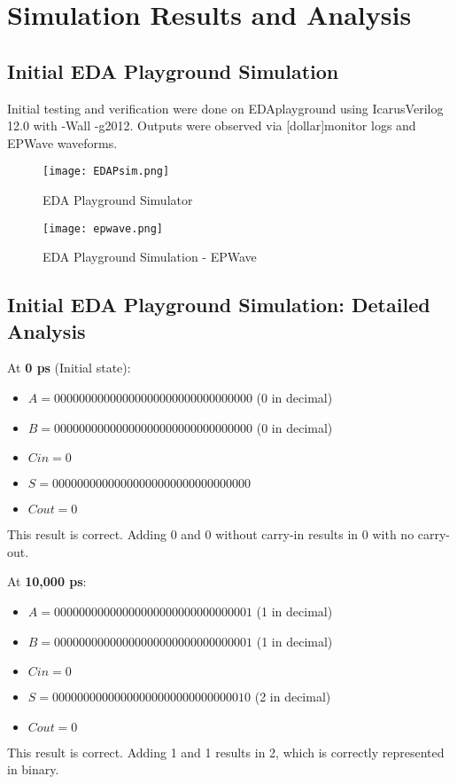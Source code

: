 \documentclass{IEEEtran}
\begin{document}
\section{Simulation Results and Analysis}
\subsection{Initial EDA Playground Simulation}
Initial testing and verification were done on EDAplayground using IcarusVerilog 12.0 with -Wall -g2012. Outputs were observed via [dollar]monitor logs and EPWave waveforms.
\begin{figure}[H]
    \centering
    \texttt{[image: EDAPsim.png]}
    \caption{EDA Playground Simulator}
    \label{fig:enter-label}
\end{figure}


\begin{figure}[H]
    \centering
    \texttt{[image: epwave.png]}
    \caption{EDA Playground Simulation - EPWave}
    \label{fig:enter-label}
\end{figure}
\subsection{Initial EDA Playground Simulation: Detailed Analysis}

\noindent At \textbf{0 ps} (Initial state):  
\begin{itemize}
    \item \( A = 00000000000000000000000000000000 \) (0 in decimal)
    \item \( B = 00000000000000000000000000000000 \) (0 in decimal)
    \item \( Cin = 0 \)
    \item \( S = 00000000000000000000000000000000 \)
    \item \( Cout = 0 \)
\end{itemize}
This result is correct. Adding 0 and 0 without carry-in results in 0 with no carry-out.

\vspace{0.5em}
\noindent At \textbf{10,000 ps}:  
\begin{itemize}
    \item \( A = 00000000000000000000000000000001 \) (1 in decimal)
    \item \( B = 00000000000000000000000000000001 \) (1 in decimal)
    \item \( Cin = 0 \)
    \item \( S = 00000000000000000000000000000010 \) (2 in decimal)
    \item \( Cout = 0 \)
\end{itemize}
This result is correct. Adding 1 and 1 results in 2, which is correctly represented in binary.
\end{document}
